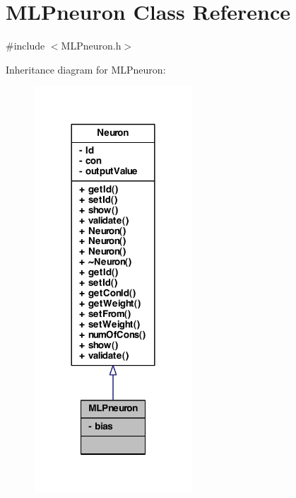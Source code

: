 \hypertarget{class_m_l_pneuron}{
\section{MLPneuron Class Reference}
\label{class_m_l_pneuron}
}


{\ttfamily \#include $<$MLPneuron.h$>$}



Inheritance diagram for MLPneuron:
\nopagebreak
\begin{figure}[H]
\begin{center}
\leavevmode
\includegraphics[width=168pt]{class_m_l_pneuron__inherit__graph}
\end{center}
\end{figure}


